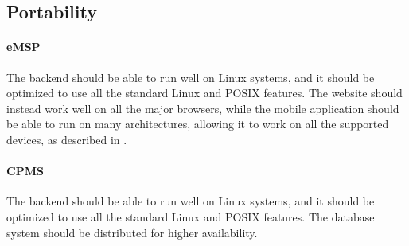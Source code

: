 \subsection{Portability}

\paragraph{eMSP} The backend should be able to run well on Linux systems, and it should be optimized to use all the standard Linux and POSIX features. The website should instead work well on all the major browsers, while the mobile application should be able to run on many architectures, allowing it to work on all the supported devices, as described in .

\paragraph{CPMS} The backend should be able to run well on Linux systems, and it should be optimized to use all the standard Linux and POSIX features. The database system should be distributed for higher availability.
